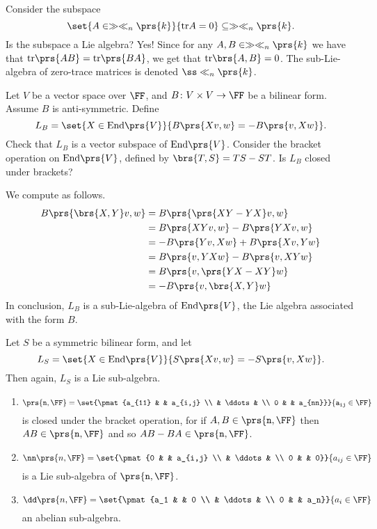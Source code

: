 \documentclass[10pt,a4paper,twoside,openany,hidelinks]{book}
\begin{document}
\begin{exercise}
Consider the subspace \[\set{A \in \gg \ll_n\prs{k}}{\mathrm{tr} A = 0} \subseteq \gg \ll_n\prs{k}\text{.}\] Is the subspace a Lie algebra? Yes! Since for any $A,B \in \gg \ll_n\prs{k}$ we have that $\mathrm{tr}\prs{AB} = \mathrm{tr}\prs{BA}$, we get that $\mathrm{tr}\brs{A,B} = 0$.
The sub-Lie-algebra of zero-trace matrices is denoted $\ss\ll_n\prs{k}$.
\end{exercise}
\begin{exercise}
Let $V$ be a vector space over $\FF$, and $B \colon V \times V \to \FF$ be a bilinear form.
Assume $B$ is anti-symmetric. Define \[L_B = \set{X \in \mathrm{End}\prs{V}}{B\prs{Xv,w} = -B\prs{v,Xw}}\text{.}\]
Check that $L_B$ is a vector subspace of $\mathrm{End}\prs{V}$.
Consider the bracket operation on $\mathrm{End}\prs{V}$, defined by $\brs{T,S} = TS - ST$.
Is $L_B$ closed under brackets?
\end{exercise}
\begin{solution}
We compute as follows.
\begin{align*}
B\prs{\brs{X,Y}v, w} &= B\prs{\prs{XY - YX}v, w} \\
&= B\prs{XY v, w} - B\prs{YXv,w} \\
&= -B\prs{Yv,Xw} + B\prs{Xv,Yw} \\
&= B\prs{v,YXw} -B\prs{v,XYw} \\
&= B\prs{v, \prs{YX - XY}w} \\
&= -B\prs{v, \brs{X,Y}w}
\end{align*}
In conclusion, $L_B$ is a sub-Lie-algebra of $\mathrm{End}\prs{V}$, the Lie algebra associated with the form $B$.
\end{solution}
\begin{exercise}
Let $S$ be a symmetric bilinear form, and let \[L_S = \set{X \in \mathrm{End}\prs{V}}{S\prs{Xv, w} = -S\prs{v,Xw}}\text{.}\]
Then again, $L_S$ is a Lie sub-algebra.
\end{exercise}
\begin{examples}
\begin{enumerate}
\item
\[\tt\prs{n,\FF} = \set{\pmat{a_{11} & & a_{i,j} \\ & \ddots & \\ 0 & & a_{nn}}}{a_{ij} \in \FF}\]
is closed under the bracket operation, for if $A,B \in \tt\prs{n,\FF}$ then $AB \in \tt\prs{n,\FF}$ and so $AB - BA \in \tt\prs{n,\FF}$.
\item \[\nn\prs{n,\FF} = \set{\pmat{0 & & a_{i,j} \\ & \ddots & \\ 0 & & 0}}{a_{ij} \in \FF}\]
is a Lie sub-algebra of $\tt\prs{n,\FF}$.
\item \[\dd\prs{n,\FF} = \set{\pmat{a_1 & & 0 \\ & \ddots & \\ 0 & & a_n}}{a_i \in \FF}\]
an abelian sub-algebra. 
\end{enumerate}
\end{examples}
\end{document}

